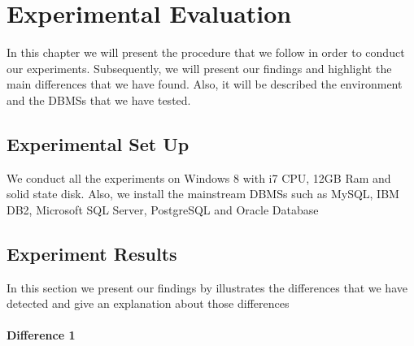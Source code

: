\chapter{Experimental Evaluation}
In this chapter we will present the procedure that we follow in order to conduct our experiments. Subsequently, we will present our findings and highlight the main differences that we have found. Also, it will be described  the environment and the DBMSs that we have tested.  

\section{Experimental Set Up}
We conduct all the experiments on Windows 8 with i7 CPU, 12GB Ram and solid state disk. Also, we install the mainstream DBMSs such as MySQL, IBM DB2, Microsoft SQL Server, PostgreSQL and Oracle Database

\section{Experiment Results}
In this section we present our findings by illustrates the differences that we have detected and give an explanation about those differences

\subsubsection{Difference 1}


 

